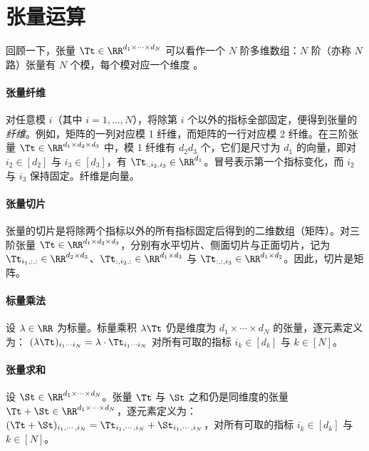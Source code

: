 \section{张量运算}\label{chapter:operations}
回顾一下，张量 $\Tt \in \RR^{d_1 \times \cdots \times d_N}$ 可以看作一个 $N$ 阶多维数组：$N$ 阶（亦称 $N$ 路）张量有 $N$ 个模，每个模对应一个维度 \citep{kolda2009tensor}。
\paragraph{张量纤维} 对任意模 $i$（其中 $i = 1, \dots, N$），将除第 $i$ 个以外的指标全部固定，便得到张量的\textit{纤维}。例如，矩阵的一列对应模 1 纤维，而矩阵的一行对应模 2 纤维。在三阶张量 $\Tt \in \RR^{d_1 \times d_2 \times d_3}$ 中，模 1 纤维有 $d_2d_3$ 个，它们是尺寸为 $d_1$ 的向量，即对 $i_2 \in [d_2]$ 与 $i_3 \in [d_3]$，有 $\Tt_{:,i_2,i_3} \in \RR^{d_1}$。冒号表示第一个指标变化，而 $i_2$ 与 $i_3$ 保持固定。纤维是向量。
\paragraph{张量切片} 张量的切片是将除两个指标以外的所有指标固定后得到的二维数组（矩阵）。对三阶张量 $\Tt \in \RR^{d_1 \times d_2 \times d_3}$，分别有水平切片、侧面切片与正面切片，记为 $\Tt_{i_1,:,:} \in \RR^{d_2 \times d_3}$、$\Tt_{:,i_2,:} \in \RR^{d_1 \times d_3}$ 与 $\Tt_{:,:,i_3} \in \RR^{d_1 \times d_2}$。因此，切片是矩阵。
\paragraph{标量乘法} 
设 $\lambda \in \RR$ 为标量。标量乘积 $\lambda\Tt$ 
 仍是维度为 $d_1 \times \cdots \times d_N$ 的张量，逐元素定义为：
$
    (\lambda\Tt)_{i_1 \cdots i_N} = \lambda \cdot \Tt_{i_1 \cdots i_N}$
对所有可取的指标 $i_k\in[d_k]$ 与 $k\in[N]$。
\paragraph{张量求和} 设 $\St\in\RR^{d_1\times\cdots\times d_N}$。张量 $\Tt$ 与 $\St$ 之和仍是同维度的张量 $\Tt+\St\in\RR^{d_1\times\cdots\times d_N}$，逐元素定义为：$(\Tt+\St)_{i_1,\cdots,i_N} = \Tt_{i_1,\cdots,i_N} + \St_{i_1,\cdots,i_N}$，对所有可取的指标 $i_k\in[d_k]$ 与 $k\in[N]$。
